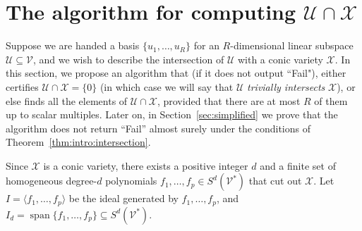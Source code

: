\documentclass[11pt]{article}
\theoremstyle{definition}
\newtheorem{fact}[theorem]{Fact}
\newcommand{\setft}[1]{\mathrm{#1}}
\newcommand{\Trans}{\setft{T}}
\newcommand{\complex}{\mathbb{C}}
\newcommand{\field}{\mathbb{F}}
\newcommand{\real}{\mathbb{R}}
\newcommand\X{\mathcal{X}}
\newcommand\Y{\mathcal{Y}}
\newcommand\A{\mathcal{A}}
\newcommand\B{\mathcal{B}}
\newcommand\V{\mathcal{V}}
\newcommand\U{\mathcal{U}}
\DeclareMathOperator{\spn}{span}
\def\ba#1\ea{\begin{align}#1\end{align}}
\begin{document}



%







\section{The algorithm for computing $\U \cap \X$}\label{sec:algorithm}


Suppose we are handed a basis $\{u_1,\dots, u_{R}\}$ for an $R$-dimensional linear subspace $\U \subseteq \V$, and we wish to describe the intersection of $\U$ with a conic variety $\X$. In this section, we propose an algorithm that (if it does not output ``Fail"), either certifies $\U \cap \X=\{0\}$ (in which case we will say that $\U$ \textit{trivially intersects} $\X$), or else finds all the elements of $\U \cap \X$, provided that there are at most $R$ of them up to scalar multiples. Later on, in Section~\ref{sec:simplified} we prove that the algorithm does not return ``Fail'' almost surely under the conditions of Theorem~\ref{thm:intro:intersection}.

Since $\X$ is a conic variety, there exists a positive integer $d$ and a finite set of homogeneous degree-$d$ polynomials $f_1,\dots, f_p \in S^d(\V^*)$ that cut out $\X$.
Let $I=\langle f_1,\dots, f_p \rangle$ be the ideal generated by $f_1,\dots, f_p$, and $I_d=\spn\{f_1,\dots, f_p\}\subseteq S^d(\V^*)$.
\end{document}
